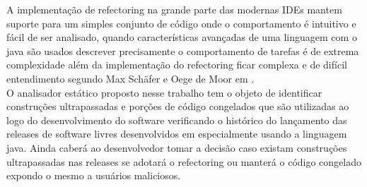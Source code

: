A implementação de refectoring na grande parte das modernas IDEs mantem suporte para um simples conjunto de código onde o comportamento é intuitivo e fácil de ser analisado,  quando características avançadas de uma linguagem com o java são usados descrever precisamente o comportamento de tarefas é de extrema complexidade além da implementação do refectoring ficar complexa e de difícil entendimento segundo Max Schäfer e Oege de Moor em \cite{Schaefer:2010:SIR:1932682.1869485}.\\

O analisador estático proposto nesse trabalho tem o objeto de identificar construções ultrapassadas e porções de código congelados que são utilizadas ao logo do desenvolvimento do software verificando o histórico do lançamento das releases de software livres desenvolvidos em especialmente usando a linguagem java. Ainda caberá ao desenvolvedor tomar a decisão caso existam construções ultrapassadas nas releases se adotará o refectoring ou manterá o código congelado expondo o mesmo a usuários maliciosos.\\




